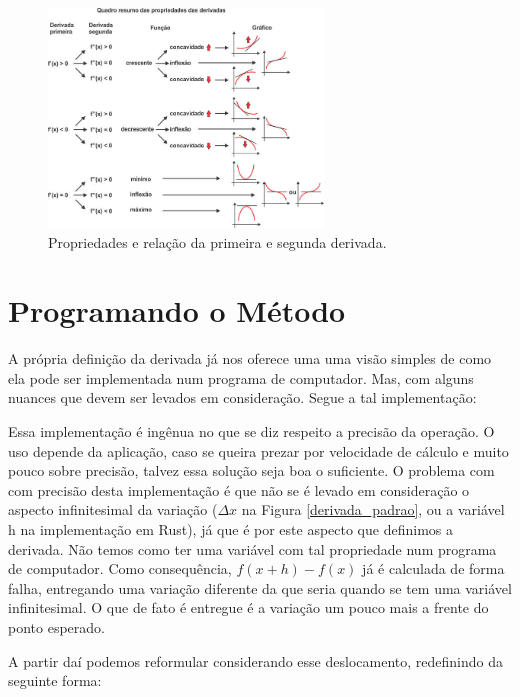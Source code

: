 \begin{figure}[h]
    \includegraphics[width=0.65\textwidth]
        {src/relacao_primeira_segunda_derivada.jpg}
    \centering
    \caption{Propriedades e relação da primeira e segunda derivada.}
    \label{relacao_primeira_segunda_derivada}
\end{figure}


\section{{Programando o Método}}

\hspace{0.8cm}


A própria definição da derivada já nos oferece uma uma visão simples de como
ela pode ser implementada num programa de computador. Mas, com alguns nuances
que devem ser levados em consideração. Segue a tal implementação:



Essa implementação é ingênua no que se diz respeito a precisão da operação. O
uso depende da aplicação, caso se queira prezar por velocidade de cálculo e
muito pouco sobre precisão, talvez essa solução seja boa o suficiente. O
problema com com precisão desta implementação é que não se é levado em
consideração o aspecto infinitesimal da variação (\(\Delta x\) na Figura
\ref{derivada_padrao}, ou a variável h na implementação em Rust), já que é por
este aspecto que definimos a derivada. Não temos como ter uma variável com tal
propriedade num programa de computador. Como consequência, \(f(x + h) - f(x)\)
já é calculada de forma falha, entregando uma variação diferente da que seria
quando se tem uma variável infinitesimal. O que de fato é entregue é a variação
um pouco mais a frente do ponto esperado.

A partir daí podemos reformular considerando esse deslocamento, redefinindo
da seguinte forma:


